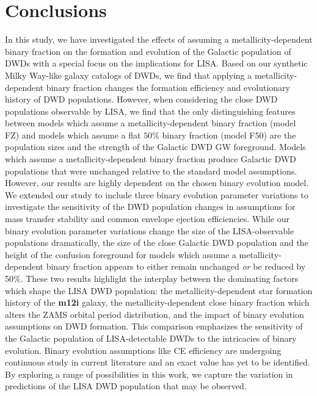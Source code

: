 \documentclass[twocolumn, linenumbers]{aastex631}
\begin{document}
\section{Conclusions}\label{sec:conclusions}
In this study, we have investigated the effects of assuming a metallicity-dependent binary fraction on the formation and evolution of the Galactic population of DWDs with a special focus on the implications for LISA. Based on our synthetic Milky Way-like galaxy catalogs of DWDs, we find that applying a metallicity-dependent binary fraction changes the formation efficiency and evolutionary history of DWD populations. However, when considering the close DWD populations observable by LISA, we find that the only distinguishing features between models which assume a metallicity-dependent binary fraction (model FZ) and models which assume a flat $50\%$ binary fraction (model F50) are the population sizes and the strength of the Galactic DWD GW foreground. Models which assume a metallicity-dependent binary fraction produce Galactic DWD populations that were unchanged relative to the standard model assumptions. However, our results are highly dependent on the chosen binary evolution model. We extended our study to include three binary evolution parameter variations to investigate the sensitivity of the DWD population changes in assumptions for mass transfer stability and common envelope ejection efficiencies. While our binary evolution parameter variations change the size of the LISA-observable populations dramatically, the size of the close Galactic DWD population and the height of the confusion foreground for models which assume a metallicity-dependent binary fraction appears to either remain unchanged \emph{or} be reduced by 50\%. These two results highlight the interplay between the dominating factors which shape the LISA DWD population: the metallicity-dependent star formation history of the \textbf{m12i} galaxy, the metallicity-dependent close binary fraction which alters the ZAMS orbital period distribution, and the impact of binary evolution assumptions on DWD formation. This comparison emphasizes the sensitivity of the Galactic population of LISA-detectable DWDs to the intricacies of binary evolution. Binary evolution assumptions like CE efficiency are undergoing continuous study in current literature and an exact value has yet to be identified. By exploring a range of possibilities in this work, we capture the variation in predictions of the LISA DWD population that may be observed.
\end{document}
